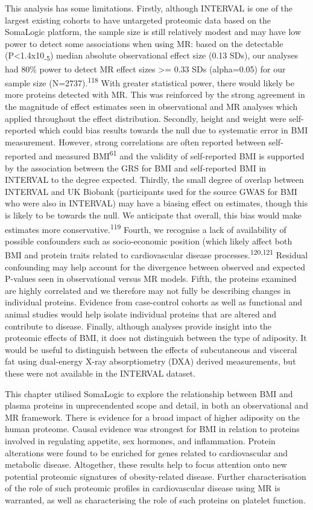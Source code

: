 \documentclass[11pt,twoside]{bristolthesis}
\begin{document}
This analysis has some limitations. Firstly, although INTERVAL is one of the largest existing cohorts to have untargeted proteomic data based on the SomaLogic platform, the sample size is still relatively modest and may have low power to detect some associations when using MR: based on the detectable (P\textless1.4x10\textsubscript{-5}) median absolute observational effect size (0.13 SDs), our analyses had 80\% power to detect MR effect sizes \textgreater= 0.33 SDs (alpha=0.05) for our sample size (N=2737).\textsuperscript{118} With greater statistical power, there would likely be more proteins detected with MR. This was reinforced by the strong agreement in the magnitude of effect estimates seen in observational and MR analyses which applied throughout the effect distribution. Secondly, height and weight were self-reported which could bias results towards the null due to systematic error in BMI measurement. However, strong correlations are often reported between self-reported and measured BMI\textsuperscript{61} and the validity of self-reported BMI is supported by the association between the GRS for BMI and self-reported BMI in INTERVAL to the degree expected. Thirdly, the small degree of overlap between INTERVAL and UK Biobank (participants used for the source GWAS for BMI who were also in INTERVAL) may have a biasing effect on estimates, though this is likely to be towards the null. We anticipate that overall, this bias would make estimates more conservative.\textsuperscript{119} Fourth, we recognise a lack of availability of possible confounders such as socio-economic position (which likely affect both BMI and protein traits related to cardiovascular disease processes.\textsuperscript{120,121} Residual confounding may help account for the divergence between observed and expected P-values seen in observational versus MR models. Fifth, the proteins examined are highly correlated and we therefore may not fully be describing changes in individual proteins. Evidence from case-control cohorts as well as functional and animal studies would help isolate individual proteins that are altered and contribute to disease. Finally, although analyses provide insight into the proteomic effects of BMI, it does not distinguish between the type of adiposity. It would be useful to distinguish between the effects of subcutaneous and visceral fat using dual-energy X-ray absorptiometry (DXA) derived measurements, but these were not available in the INTERVAL dataset.

This chapter utilised SomaLogic to explore the relationship between BMI and plasma proteins in unprecendented scope and detail, in both an observational and MR framework. There is evidence for a broad impact of higher adiposity on the human proteome. Causal evidence was strongest for BMI in relation to proteins involved in regulating appetite, sex hormones, and inflammation. Protein alterations were found to be enriched for genes related to cardiovascular and metabolic disease. Altogether, these results help to focus attention onto new potential proteomic signatures of obesity-related disease. Further characterisation of the role of such proteomic profiles in cardiovascular disease using MR is warranted, as well as characterising the role of such proteins on platelet function.
\end{document}

